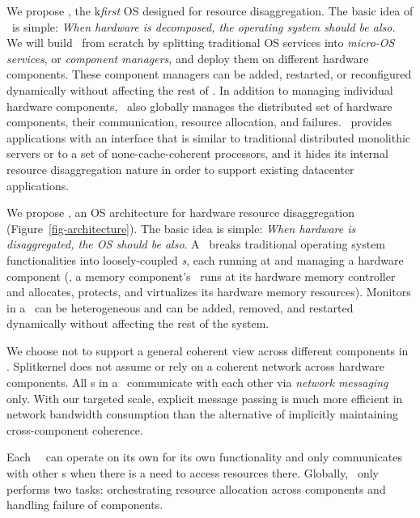 \documentclass[10pt,times,twocolumn]{z2-article}
\begin{document}
We propose \lego, the {k\em first} OS designed for resource disaggregation. 
The basic idea of \dcos\ is simple:
{\em When hardware is decomposed, the operating system should be also.}
We will build \lego\ from scratch by splitting traditional OS services into {\em micro-OS services}, or {\em component managers}, 
and deploy them on different hardware components.
These component managers can be added, restarted, or reconfigured dynamically without affecting the rest of \dcos.
In addition to managing individual hardware components, 
\lego\ also globally manages the distributed set of hardware components, 
their communication, resource allocation, and failures.
\lego\ provides applications with an interface that is similar to traditional distributed monolithic servers
or to a set of none-cache-coherent processors, 
and it hides its internal resource disaggregation nature
in order to support existing datacenter applications.
\fi

We propose {\em \splitkernel}, an OS architecture for hardware resource disaggregation (Figure~\ref{fig-architecture}).
The basic idea is simple: \textit{When hardware is disaggregated, the OS should be also}.  
A \splitkernel\ breaks traditional operating system functionalities into loosely-coupled {\em \microos{}s},
each running at and managing a hardware component
(\eg, a memory component's \microos\ runs at its hardware memory controller and allocates, protects, and virtualizes its hardware memory resources).
Monitors in a \splitkernel\ can be heterogeneous and can be added, removed, 
and restarted dynamically without affecting the rest of the system.

We choose not to support a general coherent view across different components in \splitkernel.
Splitkernel does not assume or rely on a coherent network across hardware components.
All \microos{}s in a \splitkernel\ communicate with each other via {\em network messaging} only.
With our targeted scale, explicit message passing is much more efficient in network bandwidth consumption 
than the alternative of implicitly maintaining cross-component coherence.

Each \splitkernel\ \microos\ can operate on its own for its own functionality and
only communicates with other \microos{}s when there is a need to access resources there.
Globally, \splitkernel\ only performs two tasks: 
orchestrating resource allocation across components 
and handling failure of components.
\end{document}
